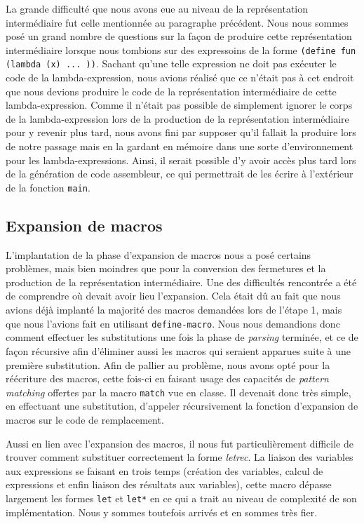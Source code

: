 \documentclass[12pt]{article}
\begin{document}
La grande difficulté que nous avons eue au niveau de la représentation intermédiaire fut celle mentionnée au paragraphe précédent. Nous nous sommes posé un grand nombre de questions sur la façon de produire cette représentation intermédiaire lorsque nous tombions sur des expressoins de la forme \texttt{(define fun (lambda (x) ... ))}. Sachant qu'une telle expression ne doit pas exécuter le code de la lambda-expression, nous avions réalisé que ce n'était pas à cet endroit que nous devions produire le code de la représentation intermédiaire de cette lambda-expression. Comme il n'était pas possible de simplement ignorer le corps de la lambda-expression lors de la production de la représentation intermédiaire pour y revenir plus tard, nous avons fini par supposer qu'il fallait la produire lors de notre passage mais en la gardant en mémoire dans une sorte d'environnement pour les lambda-expressions. Ainsi, il serait possible d'y avoir accès plus tard lors de la génération de code assembleur, ce qui permettrait de les écrire à l'extérieur de la fonction \texttt{main}.

\subsection{Expansion de macros}

L'implantation de la phase d'expansion de macros nous a posé certains problèmes, mais bien moindres que pour la conversion des fermetures et la production de la représentation intermédiaire. Une des difficultés rencontrée a été de comprendre où devait avoir lieu l'expansion. Cela était dû au fait que nous avions déjà implanté la majorité des macros demandées lors de l'étape 1, mais que nous l'avions fait en utilisant \texttt{define-macro}. Nous nous demandions donc comment effectuer les substitutions une fois la phase de \textit{parsing} terminée, et ce de façon récursive afin d'éliminer aussi les macros qui seraient apparues suite à une première substitution. Afin de pallier au problème, nous avons opté pour la réécriture des macros, cette fois-ci en faisant usage des capacités de \textit{pattern matching} offertes par la macro \texttt{match} vue en classe. Il devenait donc très simple, en effectuant une substitution, d'appeler récursivement la fonction d'expansion de macros sur le code de remplacement.

Aussi en lien avec l'expansion des macros, il nous fut particulièrement difficile de trouver comment substituer correctement la forme \textit{letrec}. La liaison des variables aux expressions se faisant en trois temps (création des variables, calcul de expressions et enfin liaison des résultats aux variables), cette macro dépasse largement les formes \texttt{let} et \texttt{let*} en ce qui a trait au niveau de complexité de son implémentation. Nous y sommes toutefois arrivés et en sommes très fier.
\end{document}
